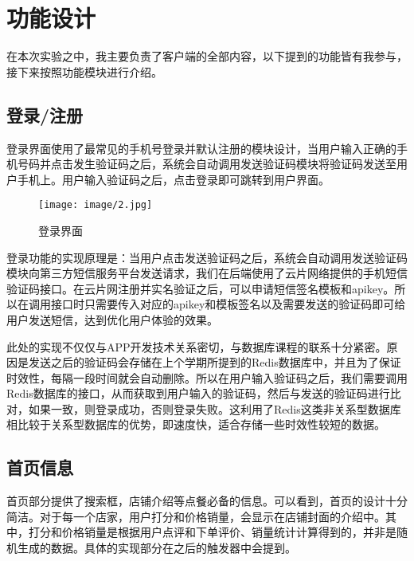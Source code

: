 \documentclass[lang=cn,a4paper,chinesefont=founder,bibend=bibtex]{shu-lab-report}
\begin{document}
\newpage


\section{功能设计}

\begin{tcolorbox}[colback=orange!5!white,colframe=orange!75!black]
  在本次实验之中，我主要负责了客户端的全部内容，以下提到的功能皆有我参与，接下来按照功能模块进行介绍。
\end{tcolorbox}


\subsection{登录/注册}

登录界面使用了最常见的手机号登录并默认注册的模块设计，当用户输入正确的手机号码并点击发生验证码之后，系统会自动调用发送验证码模块将验证码发送至用户手机上。用户输入验证码之后，点击登录即可跳转到用户界面。

\begin{figure}[htbp]
  \centering
  \texttt{[image: image/2.jpg]}
  \caption{登录界面}
  \label{fig:2}
\end{figure}

登录功能的实现原理是：当用户点击发送验证码之后，系统会自动调用发送验证码模块向第三方短信服务平台发送请求，我们在后端使用了云片网络提供的手机短信验证码接口。在云片网注册并实名验证之后，可以申请短信签名模板和apikey。所以在调用接口时只需要传入对应的apikey和模板签名以及需要发送的验证码即可给用户发送短信，达到优化用户体验的效果。

此处的实现不仅仅与APP开发技术关系密切，与数据库课程的联系十分紧密。原因是发送之后的验证码会存储在上个学期所提到的Redis数据库中，并且为了保证时效性，每隔一段时间就会自动删除。所以在用户输入验证码之后，我们需要调用Redis数据库的接口，从而获取到用户输入的验证码，然后与发送的验证码进行比对，如果一致，则登录成功，否则登录失败。这利用了Redis这类非关系型数据库相比较于关系型数据库的优势，即速度快，适合存储一些时效性较短的数据。

\newpage

\subsection{首页信息}

首页部分提供了搜索框，店铺介绍等点餐必备的信息。可以看到，首页的设计十分简洁。对于每一个店家，用户打分和价格销量，会显示在店铺封面的介绍中。其中，打分和价格销量是根据用户点评和下单评价、销量统计计算得到的，并非是随机生成的数据。具体的实现部分在之后的触发器中会提到。
\end{document}
